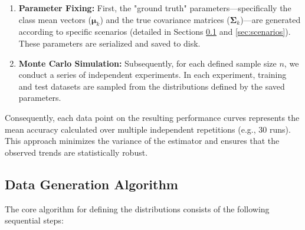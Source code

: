 \documentclass[a4paper,11pt,twoside]{report}
\theoremstyle{definition}
\begin{document}
\begin{enumerate}
    \item \textbf{Parameter Fixing:} First, the "ground truth" parameters—specifically the class mean vectors ($\boldsymbol{\mu}_k$) and the true covariance matrices ($\boldsymbol{\Sigma}_k$)—are generated according to specific scenarios (detailed in Sections \ref{sec:data_generation_algorithm} and \ref{sec:scenarios}). These parameters are serialized and saved to disk.
    \item \textbf{Monte Carlo Simulation:} Subsequently, for each defined sample size $n$, we conduct a series of independent experiments. In each experiment, training and test datasets are sampled from the distributions defined by the saved parameters.
\end{enumerate}

Consequently, each data point on the resulting performance curves represents the mean accuracy calculated over multiple independent repetitions (e.g., 30 runs). This approach minimizes the variance of the estimator and ensures that the observed trends are statistically robust.

\subsection{Data Generation Algorithm}
\label{sec:data_generation_algorithm}

The core algorithm for defining the distributions consists of the following sequential steps:
\end{document}
